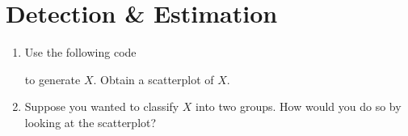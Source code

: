 \documentclass[journal,12pt,twocolumn]{IEEEtran}
\renewcommand\thesection{\arabic{section}}
\begin{document}
\section{Detection \& Estimation}
\begin{enumerate}[label=\thesection.\arabic*
,ref=\thesection.\theenumi]

%
%

%
\item Use the following code 

%
to generate $X$. Obtain a scatterplot of $X$.
%
\item
Suppose you wanted to classify  $X$ into two groups.  How would you do so by looking at the scatterplot?
%
%
%
%
%
%

\end{enumerate}
\end{document}
